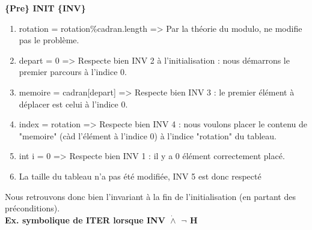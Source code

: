 \documentclass[a4paper, 12pt]{article}
\begin{document}
\textbf{\{Pre\} INIT \{INV\}}

\begin{enumerate}

\item rotation = rotation\%cadran.length => Par la théorie du modulo, ne modifie pas le problème.

\item depart = 0 => Respecte bien INV 2 à l'initialisation : nous démarrons le premier parcours à l'indice 0.

\item memoire = cadran[depart] => Respecte bien INV 3 : le premier élément à déplacer est celui à l'indice 0.

\item  index = rotation => Respecte bien INV 4 : nous voulons placer le contenu de "memoire" (càd l'élément à l'indice 0) à l'indice "rotation" du tableau.
        
\item int i = 0 => Respecte bien INV 1 : il y a 0 élément correctement placé.

\item La taille du tableau n'a pas été modifiée, INV 5 est donc respecté
\end{enumerate}

Nous retrouvons donc bien l'invariant à la fin de l'initialisation (en partant des préconditions). \\


\textbf{Ex. symbolique de ITER lorsque {INV $\dot{\wedge}$ $\neg$ H}}\\
\end{document}
